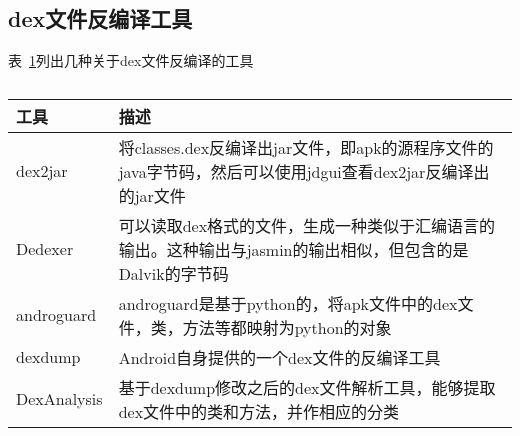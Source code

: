 \subsection{dex文件反编译工具}
\label{dextools}
表~\ref{fig:dextools}列出几种关于dex文件反编译的工具
\begin{table}[H]
\caption{\label{fig:dextools}}
\begin{tabular}{|p{2cm}|p{9.5cm}|}
\hline
工具 & 描述\\
\hline
dex2jar & 将classes.dex反编译出jar文件，即apk的源程序文件的java字节码，然后可以使用jdgui查看dex2jar反编译出的jar文件\\
\hline
Dedexer & 可以读取dex格式的文件，生成一种类似于汇编语言的输出。这种输出与jasmin的输出相似，但包含的是Dalvik的字节码\\
\hline
androguard & androguard是基于python的，将apk文件中的dex文件，类，方法等都映射为python的对象\\\hline
dexdump & Android自身提供的一个dex文件的反编译工具\\
\hline
DexAnalysis & 基于dexdump修改之后的dex文件解析工具，能够提取dex文件中的类和方法，并作相应的分类\\
\hline
\end{tabular}
\end{table}

